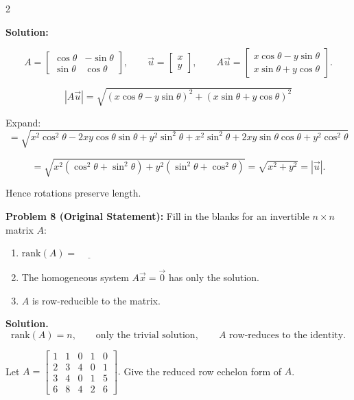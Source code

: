 \documentclass[8pt]{extarticle}
\begin{document}
\begin{multicols}{2}
\begin{tcolorbox}[title=]
\bigskip
\noindent
\textbf{Solution:}

\[
A =
\begin{bmatrix}
\cos\theta & -\sin\theta\\
\sin\theta & \cos\theta
\end{bmatrix},
\qquad
\vec{u} =
\begin{bmatrix} x\\ y \end{bmatrix},
\qquad
A\vec{u} =
\begin{bmatrix}
x\cos\theta - y\sin\theta\\
x\sin\theta + y\cos\theta
\end{bmatrix}.
\]

\[
|A\vec{u}|
= \sqrt{(x\cos\theta - y\sin\theta)^{2} + (x\sin\theta + y\cos\theta)^{2}}
\]

Expand:
\[
= \sqrt{
x^{2}\cos^{2}\theta - 2xy\cos\theta\sin\theta + y^{2}\sin^{2}\theta
+ x^{2}\sin^{2}\theta + 2xy\sin\theta\cos\theta + y^{2}\cos^{2}\theta
}
\]

\[
= \sqrt{
x^{2}(\cos^{2}\theta+\sin^{2}\theta) + y^{2}(\sin^{2}\theta+\cos^{2}\theta)
}
= \sqrt{x^{2} + y^{2}}
= |\vec{u}|.
\]

Hence rotations preserve length.
\end{tcolorbox}
\begin{tcolorbox}[title=]
\noindent
\textbf{Problem 8 (Original Statement):}
Fill in the blanks for an invertible \(n\times n\) matrix \(A\):
\begin{enumerate}
\item[(a)] \(\mathrm{rank}(A)=\underline{\hspace{1cm}}\)
\item[(b)] The homogeneous system \(A\vec{x}=\vec{0}\) has only the \underline{\hspace{2cm}} solution.
\item[(c)] \(A\) is row-reducible to the \underline{\hspace{2cm}} matrix.
\end{enumerate}

\textbf{Solution.}
\[
\mathrm{rank}(A)=n,\qquad \text{only the trivial solution},\qquad
A\text{ row-reduces to the identity}.
\]
\end{tcolorbox}

\begin{tcolorbox}[title=]
\noindent
Let
\(
A=\begin{bmatrix}
1&1&0&1&0\\
2&3&4&0&1\\
3&4&0&1&5\\
6&8&4&2&6
\end{bmatrix}.
\)
Give the reduced row echelon form of \(A\).


\end{tcolorbox}
\end{multicols}
\end{document}
